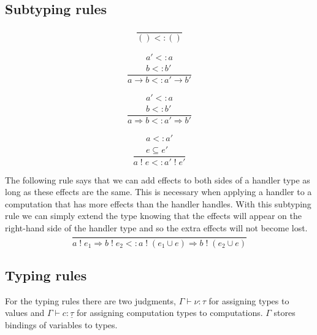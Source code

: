 \documentclass[12pt]{article}
\newcommand\ty[0]{\tau}
\newcommand\tunit[0]{()}
\newcommand\tarr[2]{#1 \rightarrow #2}
\newcommand\thandler[2]{#1 \Rightarrow #2}
\newcommand\cty[0]{\underline{\ty}}
\newcommand\aty[2]{#1 \; ! \; #2}
\newcommand\val[0]{\nu}
\newcommand\comp[0]{c}
\newcommand\subty[2]{#1 <: #2}
\begin{document}
\subsection{Subtyping rules}

\begin{minipage}{0.5\textwidth}
\[\frac{
}{
	\subty{\tunit}{\tunit}
}\]
\vspace{10pt}
\end{minipage}
\begin{minipage}{0.5\textwidth}
\[\frac{
	\begin{array}{l}
	\subty{a'}{a} \\
	\subty{b}{b'}
	\end{array}
}{
	\subty{\tarr{a}{b}}{\tarr{a'}{b'}}
}\]
\vspace{10pt}
\end{minipage}
\begin{minipage}{0.5\textwidth}
\[\frac{
	\begin{array}{l}
	\subty{a'}{a} \\
	\subty{b}{b'}
	\end{array}
}{
	\subty{\thandler{a}{b}}{\thandler{a'}{b'}}
}\]\vspace{10pt}
\end{minipage}
\begin{minipage}{0.5\textwidth}
\[\frac{
	\begin{array}{l}
	\subty{a}{a'} \\
	e \subseteq e'
	\end{array}
}{
	\subty{\aty{a}{e}}{\aty{a'}{e'}}
}\]\vspace{10pt}
\end{minipage}

The following rule says that we can add effects to both sides of a handler type as long as these effects are the same.
This is necessary when applying a handler to a computation that has more effects than the handler handles.
With this subtyping rule we can simply extend the type knowing that the effects will appear on the right-hand side of the handler type and so the extra effects will not become lost.
\[\frac{
}{
	\subty{\thandler{\aty{a}{e_1}}{\aty{b}{e_2}}}{\thandler{\aty{a}{(e_1 \cup e)}}{\aty{b}{(e_2 \cup e)}}}
}\]

\subsection{Typing rules}
For the typing rules there are two judgments,
$\Gamma \vdash \val : \ty$ for assigning types to values and $\Gamma \vdash \comp : \cty$ for assigning computation types to computations. $\Gamma$ stores bindings of variables to types.
\end{document}

